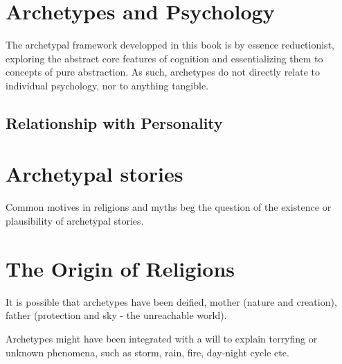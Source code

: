 \documentclass[]{book}
\begin{document}
\hypertarget{archetypes-and-psychology}{%
\chapter{Archetypes and Psychology}\label{archetypes-and-psychology}}

The archetypal framework developped in this book is by essence reductionist, exploring the abstract core features of cognition and essentializing them to concepts of pure abstraction. As such, archetypes do not directly relate to individual psychology, nor to anything tangible.

\hypertarget{relationship-with-personality}{%
\section{Relationship with Personality}\label{relationship-with-personality}}

\hypertarget{archetypal-stories}{%
\chapter{Archetypal stories}\label{archetypal-stories}}

Common motives in religions and myths beg the question of the existence or plausibility of archetypal stories.

\hypertarget{the-origin-of-religions}{%
\chapter{The Origin of Religions}\label{the-origin-of-religions}}

It is possible that archetypes have been deified, mother (nature and creation), father (protection and sky - the unreachable world).

Archetypes might have been integrated with a will to explain terryfing or unknown phenomena, such as storm, rain, fire, day-night cycle etc.


\end{document}
